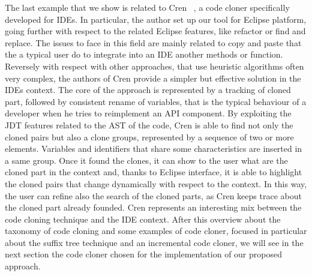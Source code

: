 The last example that we show is related to Cren  ~\cite{jablonski_cren:_2007}, a code cloner specifically developed for IDEs. In particular, the author set up our tool for Eclipse platform, going further with respect to the related Eclipse features, like refactor or  find and replace. The issues to face in this field are mainly related to copy and paste that the a typical user do to integrate into an IDE another methods or function. Reversely with respect with other approaches, that use heuristic algorithms often very complex, the authors of Cren provide a simpler but  effective solution in the IDEs context. The core of the approach is represented by a tracking of cloned part, followed by consistent rename of variables, that is the typical behaviour of a developer when he tries to reimplement an API component. By exploiting the JDT features related to the AST of the code, Cren is able to find not only the cloned pairs but also a clone groups, represented by a sequence of two or more elements. Variables and identifiers that share some characteristics are inserted in a same group. Once it found the clones, it can show to the user what are the cloned part in the context and, thanks to Eclipse interface, it is able to highlight the cloned pairs that change dynamically with respect to the context. In this way, the user can refine also the search of the cloned parts, as Cren keeps trace about the cloned part already founded. Cren represents an interesting mix between the code cloning technique and the IDE context. After this overview about the taxonomy of code cloning and some examples of code cloner, focused in particular about the suffix tree technique and an incremental code cloner, we will see in the next section the code cloner chosen for the implementation of our proposed approach. 
\newpage
